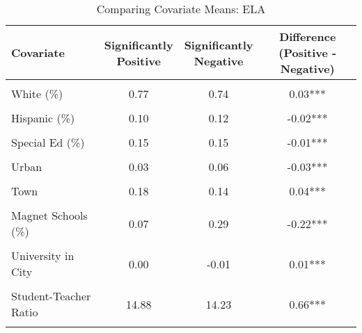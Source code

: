 \begin{table}[!h]
\centering
\caption{\label{tab:cov_means_ela}Comparing Covariate Means: ELA}
\centering
\begin{tabular}[t]{lccc}
\toprule
Covariate & \makecell[c]{Significantly\\Positive} & \makecell[c]{Significantly\\Negative} & \makecell[c]{Difference\\(Positive - Negative)}\\
\midrule
\cellcolor{gray!10}{Log of Enrollment} & \cellcolor{gray!10}{7.30} & \cellcolor{gray!10}{7.32} & \cellcolor{gray!10}{-0.02}\\
White (\%) & 0.77 & 0.74 & 0.03***\\
\cellcolor{gray!10}{Black (\%)} & \cellcolor{gray!10}{0.06} & \cellcolor{gray!10}{0.06} & \cellcolor{gray!10}{0}\\
Hispanic (\%) & 0.10 & 0.12 & -0.02***\\
\cellcolor{gray!10}{Free/Reduced Lunch (\%)} & \cellcolor{gray!10}{0.45} & \cellcolor{gray!10}{0.42} & \cellcolor{gray!10}{0.03***}\\
Special Ed (\%) & 0.15 & 0.15 & -0.01***\\
\cellcolor{gray!10}{Baseline Performance} & \cellcolor{gray!10}{0.31} & \cellcolor{gray!10}{0.42} & \cellcolor{gray!10}{-0.11***}\\
Urban & 0.03 & 0.06 & -0.03***\\
\cellcolor{gray!10}{Suburb} & \cellcolor{gray!10}{0.27} & \cellcolor{gray!10}{0.35} & \cellcolor{gray!10}{-0.09***}\\
Town & 0.18 & 0.14 & 0.04***\\
\cellcolor{gray!10}{Rural} & \cellcolor{gray!10}{0.52} & \cellcolor{gray!10}{0.45} & \cellcolor{gray!10}{0.07***}\\
Magnet Schools (\%) & 0.07 & 0.29 & -0.22***\\
\cellcolor{gray!10}{City Population (standardized)} & \cellcolor{gray!10}{0.00} & \cellcolor{gray!10}{0.01} & \cellcolor{gray!10}{-0.01***}\\
University in City & 0.00 & -0.01 & 0.01***\\
\cellcolor{gray!10}{Per Pupil Revenue} & \cellcolor{gray!10}{13411.55} & \cellcolor{gray!10}{15221.81} & \cellcolor{gray!10}{-1810.26***}\\
Student-Teacher Ratio & 14.88 & 14.23 & 0.66***\\
\cellcolor{gray!10}{Teacher Salary} & \cellcolor{gray!10}{92433.94} & \cellcolor{gray!10}{100392.11} & \cellcolor{gray!10}{-7958.17***}\\

\end{tabular}
\end{table}
